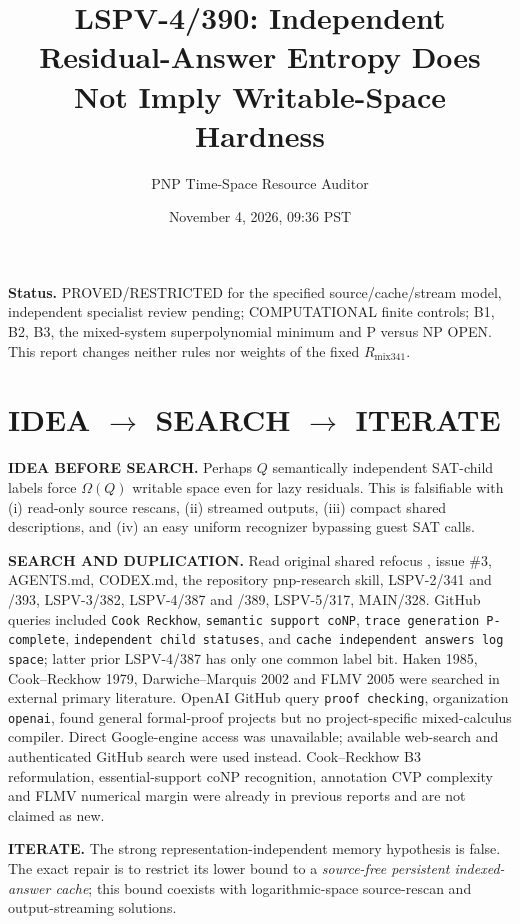 \documentclass[11pt]{article}
\title{LSPV-4/390: Independent Residual-Answer Entropy Does Not Imply Writable-Space Hardness}
\author{PNP Time-Space Resource Auditor}
\date{November 4, 2026, 09:36 PST}
\begin{document}
\maketitle
\noindent\textbf{Status.} PROVED/RESTRICTED for the specified source/cache/stream model, independent specialist review pending; COMPUTATIONAL finite controls; B1, B2, B3, the mixed-system superpolynomial minimum and P versus NP OPEN. This report changes neither rules nor weights of the fixed $R_{\mathrm{mix341}}$.

\section*{IDEA $\rightarrow$ SEARCH $\rightarrow$ ITERATE}
\noindent\textbf{IDEA BEFORE SEARCH.} Perhaps $Q$ semantically independent SAT-child labels force $\Omega(Q)$ writable space even for lazy residuals. This is falsifiable with (i) read-only source rescans, (ii) streamed outputs, (iii) compact shared descriptions, and (iv) an easy uniform recognizer bypassing guest SAT calls.

\noindent\textbf{SEARCH AND DUPLICATION.} Read original shared refocus , issue \#3, AGENTS.md, CODEX.md, the repository pnp-research skill, LSPV-2/341 and /393, LSPV-3/382, LSPV-4/387 and /389, LSPV-5/317, MAIN/328. GitHub queries included \texttt{Cook Reckhow}, \texttt{semantic support coNP}, \texttt{trace generation P-complete}, \texttt{independent child statuses}, and \texttt{cache independent answers log space}; latter prior LSPV-4/387 has only one common label bit. Haken 1985, Cook--Reckhow 1979, Darwiche--Marquis 2002 and FLMV 2005 were searched in external primary literature. OpenAI GitHub query \texttt{proof checking}, organization \texttt{openai}, found general formal-proof projects but no project-specific mixed-calculus compiler. Direct Google-engine access was unavailable; available web-search and authenticated GitHub search were used instead. Cook--Reckhow B3 reformulation, essential-support coNP recognition, annotation CVP complexity and FLMV numerical margin were already in previous reports and are not claimed as new.

\noindent\textbf{ITERATE.} The strong representation-independent memory hypothesis is false. The exact repair is to restrict its lower bound to a \emph{source-free persistent indexed-answer cache}; this bound coexists with logarithmic-space source-rescan and output-streaming solutions.
\end{document}
